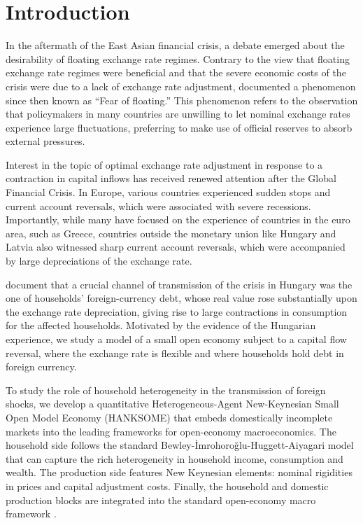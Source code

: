 \documentclass[\latexroot/\projectname]{subfiles}
\begin{document}
\section{Introduction}
\whenintegrated{\label{sec:intro}} %
\setcounter{page}{0}

In the aftermath of the East Asian financial crisis, a debate emerged about the desirability of floating exchange rate regimes. Contrary to the view that floating exchange rate regimes were beneficial and that the severe economic costs of the crisis were due to a lack of exchange rate adjustment, \cite{CalvoReinhart2002} documented a phenomenon since then known as ``Fear of floating.'' This phenomenon refers to the observation that policymakers in many countries are unwilling to let nominal exchange rates experience large fluctuations, preferring to make use of official reserves to absorb external pressures.

Interest in the topic of optimal exchange rate adjustment in response to a contraction in capital inflows has received renewed attention after the Global Financial Crisis. In Europe, various countries experienced sudden stops and current account reversals, which were associated with severe recessions. Importantly, while many have focused on the experience of countries in the euro area, such as Greece, countries outside the monetary union like Hungary and Latvia also witnessed sharp current account reversals, which were accompanied by large depreciations of the exchange rate.

\cite{VernerGyongyosi2018} document that a crucial channel of transmission of the crisis in Hungary was the one of households' foreign-currency debt, whose real value rose substantially upon the exchange rate depreciation, giving rise to large contractions in consumption for the affected households. Motivated by the evidence of the Hungarian experience, we study a model of a small open economy subject to a capital flow reversal, where the exchange rate is flexible and where households hold debt in foreign currency.

To study the role of household heterogeneity in the transmission of foreign shocks, we develop a quantitative Heterogeneous-Agent New-Keynesian Small Open Model Economy (HANKSOME) that embeds domestically incomplete markets into the leading frameworks for open-economy macroeconomics. The household side follows the standard Bewley-\.{I}mrohoro\u{g}lu-Huggett-Aiyagari model that can capture the rich heterogeneity in household income, consumption and wealth. The production side features New Keynesian elements: nominal rigidities in prices and capital adjustment costs. Finally, the household and domestic production blocks are integrated into the standard open-economy macro framework \citep{ObstfeldRogoff2000,Svensson2000,GaliMonacelli2005}.
\end{document}
